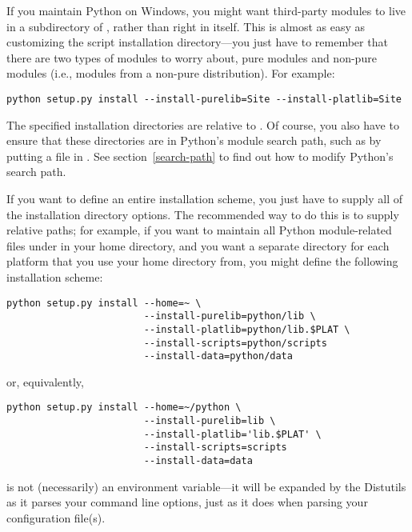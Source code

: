 \documentclass{howto}
\begin{document}
If you maintain Python on Windows, you might want third-party modules to
live in a subdirectory of , rather than right in
 itself.  This is almost as easy as customizing the
script installation directory---you just have to remember that there are
two types of modules to worry about, pure modules and non-pure modules
(i.e., modules from a non-pure distribution).  For example:

\begin{verbatim}
python setup.py install --install-purelib=Site --install-platlib=Site
\end{verbatim}

The specified installation directories are relative to
.  Of course, you also have to ensure that these
directories are in Python's module search path, such as by putting a
 file in .  See section~\ref{search-path}
to find out how to modify Python's search path.

If you want to define an entire installation scheme, you just have to
supply all of the installation directory options.  The recommended way
to do this is to supply relative paths; for example, if you want to
maintain all Python module-related files under  in your
home directory, and you want a separate directory for each platform that
you use your home directory from, you might define the following
installation scheme:

\begin{verbatim}
python setup.py install --home=~ \
                        --install-purelib=python/lib \
                        --install-platlib=python/lib.$PLAT \
                        --install-scripts=python/scripts
                        --install-data=python/data
\end{verbatim}

or, equivalently,

\begin{verbatim}
python setup.py install --home=~/python \
                        --install-purelib=lib \
                        --install-platlib='lib.$PLAT' \
                        --install-scripts=scripts
                        --install-data=data
\end{verbatim}

\code{\$PLAT} is not (necessarily) an environment variable---it will be
expanded by the Distutils as it parses your command line options, just
as it does when parsing your configuration file(s).
\end{document}
